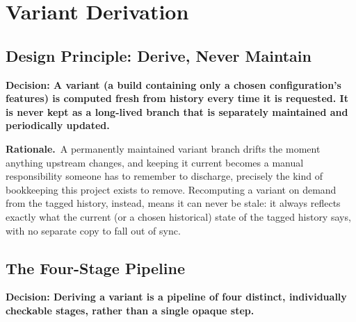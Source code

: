 \documentclass[11pt]{article}
\newcommand{\decision}[1]{\medskip\noindent\textbf{Decision: #1}\par\nopagebreak\smallskip}
\newcommand{\rationale}{\noindent\textbf{Rationale.}\ }
\begin{document}
\section{Variant Derivation}
\label{sec:derivation}

\subsection{Design Principle: Derive, Never Maintain}

\decision{A variant (a build containing only a chosen configuration's
features) is computed fresh from history every time it is requested. It
is never kept as a long-lived branch that is separately maintained and
periodically updated.}

\rationale A permanently maintained variant branch drifts the moment
anything upstream changes, and keeping it current becomes a manual
responsibility someone has to remember to discharge, precisely the kind
of bookkeeping this project exists to remove. Recomputing a variant
on demand from the tagged history, instead, means it can never be stale:
it always reflects exactly what the current (or a chosen historical)
state of the tagged history says, with no separate copy to fall out of
sync.

\subsection{The Four-Stage Pipeline}
\label{sec:pipeline}

\decision{Deriving a variant is a pipeline of four distinct, individually
checkable stages, rather than a single opaque step.}
\end{document}
